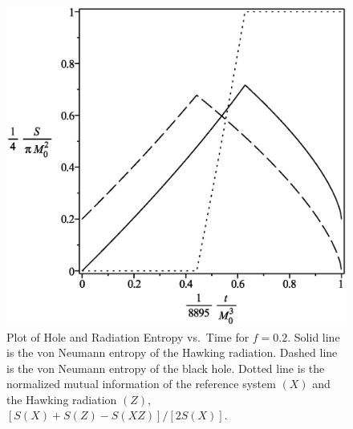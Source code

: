 \documentclass[12pt]{article}
\begin{document}
\begin{figure}[H]
\centering
\includegraphics[width=1\textwidth]{Hawking-hole-radiation-mutual-entropy-vs-time-graph-10f-is-2.eps}
\caption{Plot of Hole and Radiation Entropy vs.\ Time for $f=0.2$.
Solid line is the von Neumann entropy of the Hawking radiation.
Dashed line is the von Neumann entropy of the black hole.
Dotted line is the normalized mutual information of the reference system $(X)$ and the Hawking radiation $(Z)$, $[S(X)+S(Z)-S(XZ)]/[2S(X)]$.}
\end{figure}
\end{document}
